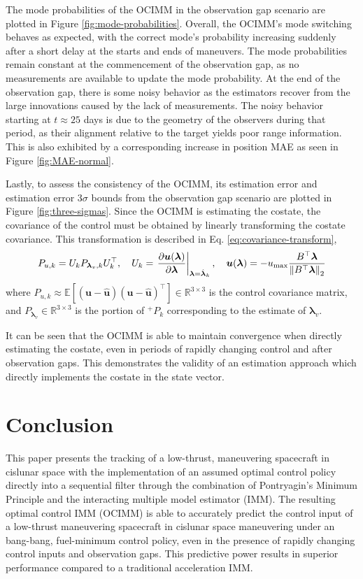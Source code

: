 \documentclass[letterpaper, preprint, paper,11pt]{AAS}	%
\newcommand{\R}{\mathbb{R}}
\newcommand{\E}{\mathbb{E}}
\begin{document}
The mode probabilities of the OCIMM in the observation gap scenario are plotted in Figure \ref{fig:mode-probabilities}. Overall, the OCIMM's mode switching behaves as expected, with the correct mode's probability increasing suddenly after a short delay at the starts and ends of maneuvers. The mode probabilities remain constant at the commencement of the observation gap, as no measurements are available to update the mode probability. At the end of the observation gap, there is some noisy behavior as the estimators recover from the large innovations caused by the lack of measurements. The noisy behavior starting at $t \approx 25$ days is due to the geometry of the observers during that period, as their alignment relative to the target yields poor range information. This is also exhibited by a corresponding increase in position MAE as seen in Figure \ref{fig:MAE-normal}.


Lastly, to assess the consistency of the OCIMM, its estimation error and estimation error $3\sigma$ bounds from the observation gap scenario are plotted in Figure \ref{fig:three-sigmas}. Since the OCIMM is estimating the costate, the covariance of the control must be obtained by linearly transforming the costate covariance. This transformation is described in Eq. \ref{eq:covariance-transform},
\begin{align}
    P_{u, k} = U_kP_{\bm{\lambda}_v, k}U_k^\top, \quad U_k = \left. \frac{\partial \bm{u}(\bm{\lambda})}{\partial{\bm{\lambda}}} \right|_{\bm{\lambda}=\hat{\bm{\lambda}}_k}, \quad \bm{u}(\bm{\lambda}) = -u_\text{max} \frac{B^\top \bm{\lambda}}{\norm{B^\top \bm{\lambda}}_2} \label{eq:covariance-transform}
\end{align}
\noindent where $P_{u,k} \approx \E[(\bm{u} - \hat{\bm{u}})(\bm{u} - \hat{\bm{u}})^\top] \in \R^{3 \times 3}$ is the control covariance matrix, and $P_{\bm{\lambda}_v} \in \R^{3 \times 3}$ is the portion of ${}^+P_k$ corresponding to the estimate of $\bm{\lambda}_v$. 

It can be seen that the OCIMM is able to maintain convergence when directly estimating the costate, even in periods of rapidly changing control and after observation gaps. This demonstrates the validity of an estimation approach which directly implements the costate in the state vector.

\section{Conclusion}

This paper presents the tracking of a low-thrust, maneuvering spacecraft in cislunar space with the implementation of an assumed optimal control policy directly into a sequential filter through the combination of Pontryagin's Minimum Principle and the interacting multiple model estimator (IMM). The resulting optimal control IMM (OCIMM) is able to accurately predict the control input of a low-thrust maneuvering spacecraft in cislunar space maneuvering under an bang-bang, fuel-minimum control policy, even in the presence of rapidly changing control inputs and observation gaps. This predictive power results in superior performance compared to a traditional acceleration IMM. 
\end{document}
